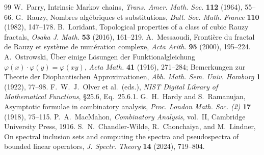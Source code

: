 \documentclass[11pt,reqno]{amsart}
\theoremstyle{definition}
\theoremstyle{remark}
\numberwithin{equation}{section}
\begin{document}
\begin{thebibliography}{99}
 W.~Parry, Intrinsic Markov chains, \emph{Trans. Amer. Math. Soc.} \textbf{112} (1964), 55--66.
 G.~Rauzy, Nombres alg\'ebriques et substitutions, \emph{Bull. Soc. Math. France} \textbf{110} (1982), 147--178.
 B.~Loridant, Topological properties of a class of cubic Rauzy fractals, \emph{Osaka J. Math.} \textbf{53} (2016), 161--219.
 A.~Messaoudi, Fronti\`ere du fractal de Rauzy et syst\`eme de num\'eration complexe, \emph{Acta Arith.} \textbf{95} (2000), 195--224.
 A.~Ostrowski, \"Uber einige L\"osungen der Funktionalgleichung $\varphi(x)\cdot\varphi(y)=\varphi(xy)$, \emph{Acta Math.} \textbf{41} (1916), 271--284; Bemerkungen zur Theorie der Diophantischen Approximationen, \emph{Abh. Math. Sem. Univ. Hamburg} \textbf{1} (1922), 77--98.
 F.~W.~J.~Olver et al.\ (eds.), \emph{NIST Digital Library of Mathematical Functions}, \S25.6, Eq.~25.6.1.
 G.~H.~Hardy and S.~Ramanujan, Asymptotic formulae in combinatory analysis, \emph{Proc. London Math. Soc. (2)} \textbf{17} (1918), 75--115.
 P.~A.~MacMahon, \emph{Combinatory Analysis}, vol.~II, Cambridge University Press, 1916.
 S.~N.~Chandler-Wilde, R.~Chonchaiya, and M.~Lindner, On spectral inclusion sets and computing the spectra and pseudospectra of bounded linear operators, \emph{J. Spectr. Theory} \textbf{14} (2024), 719--804.
\end{thebibliography}
\end{document}
